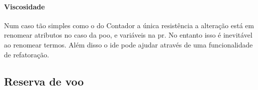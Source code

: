\paragraph{Viscosidade}
\label{sec:viscosidade}
Num caso tão simples como o do Contador a única resistência a alteração
está em renomear atributos no caso da \gls{poo}, e variáveis na \gls{pr}.
No entanto isso é inevitável ao renomear termos.
Além disso o \gls{ide} pode ajudar através de uma funcionalidade de refatoração.
\subsection{Reserva de voo}
\label{sec:reserva-de-voo}
